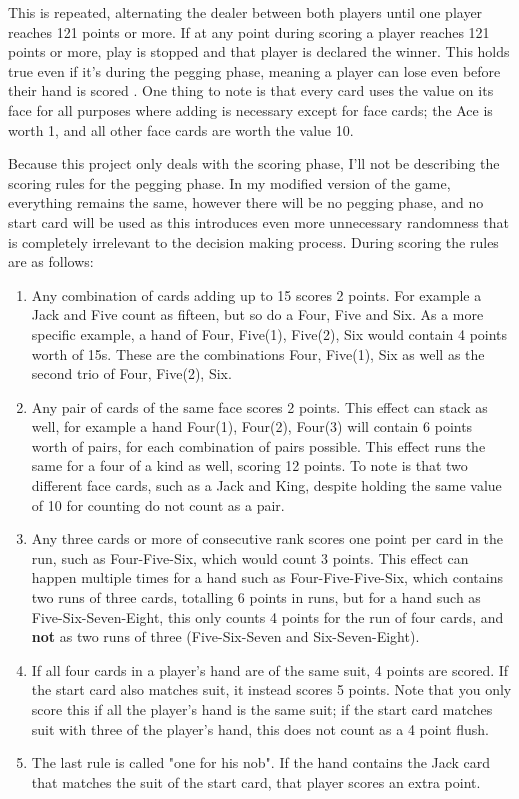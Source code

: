 \documentclass[]{article}
\begin{document}
This is repeated, alternating the dealer between both players until one player reaches 121 points or more. If at any point during scoring a player reaches 121 points or more, play is stopped and that player is declared the winner. This holds true even if it's during the pegging phase, meaning a player can lose even before their hand is scored \cite{cribbage_rules}\cite{cribbage_rules_montana}. One thing to note is that every card uses the value on its face for all purposes where adding is necessary except for face cards; the Ace is worth 1, and all other face cards are worth the value 10. 

Because this project only deals with the scoring phase, I'll not be describing the scoring rules for the pegging phase. In my modified version of the game, everything remains the same, however there will be no pegging phase, and no start card will be used as this introduces even more unnecessary randomness that is completely irrelevant to the decision making process. During scoring the rules are as follows: 

\begin{enumerate}
    \item Any combination of cards adding up to 15 scores 2 points. For example a Jack and Five count as fifteen, but so do a Four, Five and Six. As a more specific example, a hand of Four, Five(1), Five(2), Six would contain 4 points worth of 15s. These are the combinations Four, Five(1), Six as well as the second trio of Four, Five(2), Six. 
    \item Any pair of cards of the same face scores 2 points. This effect can stack as well, for example a hand Four(1), Four(2), Four(3) will contain 6 points worth of pairs, for each combination of pairs possible. This effect runs the same for a four of a kind as well, scoring 12 points. To note is that two different face cards, such as a Jack and King, despite holding the same value of 10 for counting do not count as a pair. 
    \item Any three cards or more of consecutive rank scores one point per card in the run, such as Four-Five-Six, which would count 3 points. This effect can happen multiple times for a hand such as Four-Five-Five-Six, which contains two runs of three cards, totalling 6 points in runs, but for a hand such as Five-Six-Seven-Eight, this only counts 4 points for the run of four cards, and \textbf{not} as two runs of three (Five-Six-Seven and Six-Seven-Eight). 
    \item If all four cards in a player's hand are of the same suit, 4 points are scored. If the start card also matches suit, it instead scores 5 points. Note that you only score this if all the player's hand is the same suit; if the start card matches suit with three of the player's hand, this does not count as a 4 point flush.
    \item The last rule is called "one for his nob". If the hand contains the Jack card that matches the suit of the start card, that player scores an extra point. 
\end{enumerate}
\end{document}
